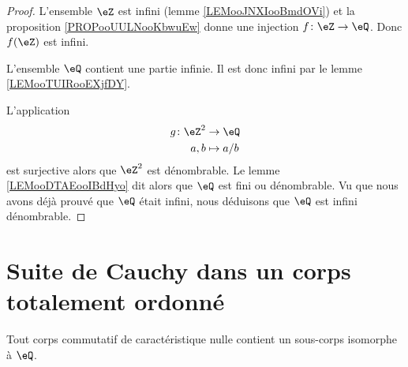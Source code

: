 \begin{proof}
	L'ensemble \( \eZ\) est infini (lemme \ref{LEMooJNXIooBmdOVi}) et la proposition \ref{PROPooUULNooKbwuEw} donne une injection \( f\colon \eZ\to \eQ\). Donc \( f(\eZ)\) est infini.

	L'ensemble \( \eQ\) contient une partie infinie. Il est donc infini par le lemme \ref{LEMooTUIRooEXjfDY}.

	L'application
	\begin{equation}
		\begin{aligned}
			g\colon \eZ^2 & \to \eQ     \\
			a,b           & \mapsto a/b
		\end{aligned}
	\end{equation}
	est surjective alors que \( \eZ^2\) est dénombrable. Le lemme \ref{LEMooDTAEooIBdHyo} dit alors que \( \eQ\) est fini ou dénombrable. Vu que nous avons déjà prouvé que \( \eQ\) était infini, nous déduisons que \( \eQ\) est infini dénombrable.
\end{proof}



\section{Suite de Cauchy dans un corps totalement ordonné}


\begin{lemma}        \label{LEMooLTBIooSZnvsQ}
	Tout corps commutatif de caractéristique nulle contient un sous-corps isomorphe à \( \eQ\).
\end{lemma}

